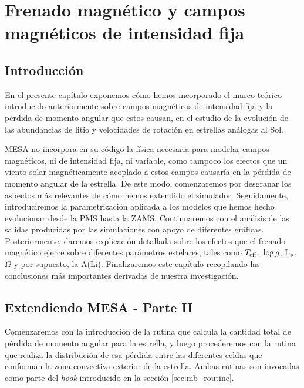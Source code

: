 

\chapter{Frenado magnético y campos magnéticos de intensidad fija}\label{ch:quinto-capitulo}
\section{Introducción}
En el presente capítulo exponemos cómo hemos incorporado el marco teórico introducido anteriormente sobre campos magnéticos de intensidad fija y la pérdida de momento angular que estos causan, en el estudio de la evolución de las abundancias de litio y velocidades de rotación en estrellas análogas al Sol.\par

MESA no incorpora en su código la física necesaria para modelar campos magnéticos, ni de intensidad fija, ni variable, como tampoco los efectos que un viento solar magnéticamente acoplado a estos campos causaría en la pérdida de momento angular de la estrella. De este modo, comenzaremos por desgranar los aspectos más relevantes de cómo hemos extendido el simulador. Seguidamente, introduciremos la parametrización aplicada a los modelos que hemos hecho evolucionar desde la PMS hasta la ZAMS. Continuaremos con el análisis de las salidas producidas por las simulaciones con apoyo de diferentes gráficas. Posteriormente, daremos explicación detallada sobre los efectos que el frenado magnético ejerce sobre diferentes parámetros estelares, tales como $T_{\mathrm{eff}}$, $\mathrm{log} \, g$, $\mathrm{L}_*$, $\Omega$ y por supuesto, la A(Li). Finalizaremos este capítulo recopilando las conclusiones más importantes derivadas de nuestra investigación.\par


\section{Extendiendo MESA - Parte II }
Comenzaremos con la introducción de la rutina que calcula la cantidad total de pérdida de momento angular para la estrella, y luego procederemos con la rutina que realiza la distribución de esa pérdida entre las diferentes celdas que conforman la zona convectiva exterior de la estrella. Ambas rutinas son invocadas como parte del \textit{hook} introducido en la sección \ref{sec:mb_routine}. \par

